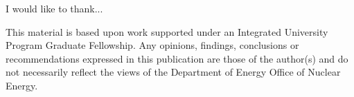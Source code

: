 I would like to thank...

This material is based upon work supported under an Integrated University 
Program Graduate Fellowship. Any opinions, findings, conclusions or 
recommendations expressed in this publication are those of the author(s) 
and do not necessarily reflect the views of the Department of Energy Office 
of Nuclear Energy.